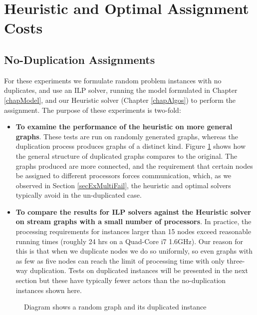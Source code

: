 \section{Heuristic and Optimal Assignment Costs}

\subsection{No-Duplication Assignments}

For these experiments we formulate random problem instances with no duplicates, and use an ILP solver, running the model formulated in Chapter \ref{chapModel}, and our Heuristic solver (Chapter \ref{chapAlgos}) to perform the assignment.
The purpose of these experiments is two-fold:
\begin{itemize}
	\item {\bf To examine the performance of the heuristic on more general graphs}.
			These tests are run on randomly generated graphs, whereas the duplication process produces graphs of a distinct kind.
			Figure \ref{figDupCompare} shows how the general structure of duplicated graphs compares to the original.
			The graphs produced are more connected, and the requirement that certain nodes be assigned to different processors forces communication, which, as we observed in Section \ref{secExMultiFail}, the heuristic and optimal solvers typically avoid in the un-duplicated case.
	\item {\bf To compare the results for ILP solvers against the Heuristic solver on stream graphs with a small number of processors}.
			In practice, the processing requirements for instances larger than 15 nodes exceed reasonable running times (roughly 24 hrs on a Quad-Core i7 1.6GHz).
			Our reason for this is that when we duplicate nodes we do so uniformly, so even graphs with as few as five nodes can reach the limit of processing time with only three-way duplication.
			Tests on duplicated instances will be presented in the next section but these have typically fewer actors than the no-duplication instances shown here.
\end{itemize}


\begin{figure}
\begin{center}
	
\caption{Diagram shows a random graph and its duplicated instance}
\label{figDupCompare}
\end{center}
\end{figure}

